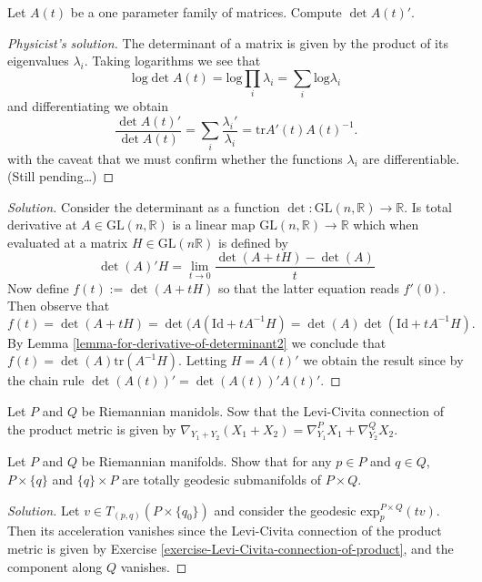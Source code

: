 \begin{exercise}
\label{exercise-derivative-of-determinant}
Let $A(t)$ be a one parameter family of matrices. Compute $\det A(t)'$.
\end{exercise}

\begin{proof}[Physicist's solution]
The determinant of a matrix is given by the product of its eigenvalues
$\lambda_i$. Taking logarithms we see that
$$
\text{log}\det A(t)=\text{log}\prod_{i}\lambda_i=\sum_{i}\text{log}\lambda_i
$$
and differentiating we obtain
$$
\frac{\det A(t)'}{\det A(t)}=\sum_i \frac{\lambda_i'}{\lambda_i}
=\text{tr} A'(t)A(t)^{-1}.
$$
with the caveat that we must confirm whether the functions $\lambda_i$ are
differentiable. (Still pending…)
\end{proof}

\begin{proof}[Solution]
Consider the determinant as a function 
$\det:\text{GL}(n,\mathbb{R})\to\mathbb{R}$. Is total derivative at 
$A \in \text{GL}(n,\mathbb{R})$ is a linear map 
$\text{GL}(n,\mathbb{R})\to \mathbb{R}$ which when evaluated at a matrix
$H\in\text{GL}(n\mathbb{R})$ is defined by
$$
\det(A)'H=\lim_{t\to0}\frac{\det(A+tH)-\det(A)}{t} 
$$
Now define $f(t):=\det(A+tH)$ so that the latter equation reads $f'(0)$. Then
observe that
$$
f(t)=\det(A+tH)=\det(A(\text{Id}+tA^{-1}H)=\det(A)\det(\text{Id}+tA^{-1}H).
$$
By Lemma \ref{lemma-for-derivative-of-determinant2} we conclude that 
$f(t)=\det(A)\text{tr}(A^{-1}H)$. Letting $H=A(t)'$ we obtain the result since
by the chain rule $\det(A(t))'=\det(A(t))'A(t)'$.
\end{proof}

\begin{exercise}
\label{exercise-Levi-Civita-connection-of-product}
Let $P$ and $Q$ be Riemannian manidols. Sow that the Levi-Civita connection of
the product metric is given by
$\nabla_{Y_1+Y_2}(X_1+X_2)=\nabla^P_{Y_1}X_1+\nabla^Q_{Y_2}X_2$.
\end{exercise}

\begin{exercise}
\label{exercise-totally-geodesic-submanifolds-of-product}
Let $P$ and $Q$ be Riemannian manifolds. Show that for any $p \in P$ and $q \in
Q$, $P\times \{q\}$ and $\{q\}\times P$ are totally geodesic
submanifolds of $P \times Q$.
\end{exercise}

\begin{proof}[Solution]
Let $v \in T_{(p,q)}(P\times\{q_0\})$ and consider the geodesic
 $\text{exp}_p^{P\times Q}(tv)$. Then
its acceleration vanishes since the Levi-Civita connection of the product metric
is given by Exercise \ref{exercise-Levi-Civita-connection-of-product}, and the
component along $Q$ vanishes.
\end{proof}

